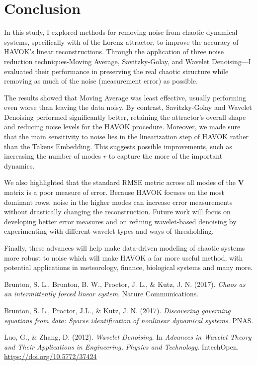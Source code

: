 \documentclass[11pt]{article}
\begin{document}
	\section{Conclusion}
	In this study, I explored methods for removing noise from chaotic dynamical systems, specifically with of the Lorenz attractor, to improve the accuracy of HAVOK's linear reconstructions. Through the application of three noise reduction techniques-Moving Average, Savitzky-Golay, and Wavelet Denoising—I evaluated their performance in preserving the real chaotic structure while removing as much of the noise (measurement error) as possible.
	
	The results showed that Moving Average was least effective, usually performing even worse than leaving the data noisy. By contrast, Savitzky-Golay and Wavelet Denoising performed significantly better, retaining the attractor’s overall shape and reducing noise levels for the HAVOK procedure. Moreover, we made sure that the main sensitivity to noise lies in the linearization step of HAVOK rather than the Takens Embedding. This suggests possible improvements, such as increasing the number of modes \(r\) to capture the more of the important dynamics.
	
	We also highlighted that the standard RMSE metric across all modes of the \(\mathbf{V}\) matrix is a poor measure of error. Because HAVOK focuses on the most dominant rows, noise in the higher modes can increase error measurements without drastically changing the reconstruction. Future work will focus on developing better error measures and on refining wavelet-based denoising by experimenting with different wavelet types and ways of thresholding.
	
	Finally, these advances will help make data-driven modeling of chaotic systems more robust to noise which will make HAVOK a far more useful method, with potential applications in meteorology, finance, biological systems and many more.
	
	\begin{thebibliography}{99}
		
		Brunton, S. L., Brunton, B. W., Proctor, J. L., \& Kutz, J. N. (2017).
		\textit{Chaos as an intermittently forced linear system}. Nature Communications.
		
		Brunton, S. L., Proctor, J.L., \& Kutz, J. N. (2017).
		\textit{Discovering governing equations from data: Sparse identification of nonlinear dynamical systems}. PNAS.
		
		Luo, G., \& Zhang, D. (2012). 
		\textit{Wavelet Denoising}. In \textit{Advances in Wavelet Theory and Their Applications in Engineering, Physics and Technology}. IntechOpen. 
		\href{https://doi.org/10.5772/37424}{https://doi.org/10.5772/37424}
		
	\end{thebibliography}
	
\end{document}
